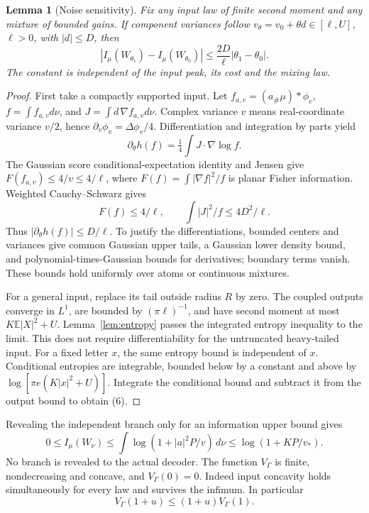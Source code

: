 \documentclass[11pt]{article}
\newtheorem{lemma}[theorem]{Lemma}
\newcommand{\E}{\mathbb E}
\begin{document}
\begin{lemma}[Noise sensitivity]\label{lem:noise}
Fix any input law of finite second moment and any mixture of bounded
gains. If component variances follow
\(v_\theta=v_0+\theta d\in[\ell,U]\), \(\ell>0\), with
\(|d|\leq D\), then
\[
 |I_\mu(W_{\theta_1})-I_\mu(W_{\theta_0})|
       \leq \frac{2D}{\ell}|\theta_1-\theta_0|.              \tag{6}
\]
The constant is independent of the input peak, its cost and the mixing law.
\end{lemma}
\begin{proof}
First take a compactly supported input. Let
\(f_{a,v}=(a_\#\mu)*\phi_v\), \(f=\int f_{a,v}d\nu\), and
\(J=\int d\,\nabla f_{a,v}d\nu\). Complex variance \(v\) means
real-coordinate variance \(v/2\), hence
\(\partial_v\phi_v=\Delta\phi_v/4\).
Differentiation and integration by parts yield
\[
 \partial_\theta h(f)=\tfrac14\int J\cdot\nabla\log f .
\]
The Gaussian score conditional-expectation identity and Jensen give
\(F(f_{a,v})\leq4/v\leq4/\ell\), where
\(F(f)=\int |\nabla f|^2/f\) is planar Fisher information.
Weighted Cauchy--Schwarz gives
\[
 F(f)\leq4/\ell,\qquad \int |J|^2/f\leq4D^2/\ell .
\]
Thus \(|\partial_\theta h(f)|\leq D/\ell\).
To justify the differentiations, bounded centers and variances give
common Gaussian upper tails, a Gaussian lower density bound, and
polynomial-times-Gaussian bounds for derivatives; boundary terms vanish.
These bounds hold uniformly over atoms or continuous mixtures.

For a general input, replace its tail outside radius \(R\) by zero.
The coupled outputs converge in \(L^1\), are bounded by
\((\pi\ell)^{-1}\), and have second moment at most
\(K\E|X|^2+U\). Lemma~\ref{lem:entropy} passes the integrated entropy
inequality to the limit. This does not require differentiability for the
untruncated heavy-tailed input.
For a fixed letter \(x\), the same entropy bound is independent of \(x\).
Conditional entropies are integrable, bounded below by a constant and
above by \(\log[\pi e(K|x|^2+U)]\). Integrate the conditional bound and
subtract it from the output bound to obtain (6).
\end{proof}

Revealing the independent branch only for an information upper bound gives
\[
 0\leq I_\mu(W_\nu)
 \leq\int\log(1+|a|^2P/v)\,d\nu
 \leq\log(1+KP/v_*).                                      \tag{7}
\]
No branch is revealed to the actual decoder. The function \(V_\Gamma\)
is finite, nondecreasing and concave, and \(V_\Gamma(0)=0\).
Indeed input concavity holds simultaneously for every law and survives
the infimum. In particular
\[
 V_\Gamma(1+u)\leq(1+u)V_\Gamma(1).                         \tag{8}
\]
\end{document}
